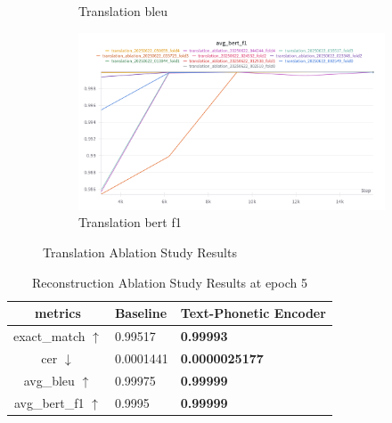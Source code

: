 \documentclass[letterpaper]{article} %
\begin{document}
\begin{figure}[ht]
\begin{subfigure}[b]{0.45\textwidth}
        \caption{Translation bleu}
        \label{fig:trans_bleu}
    \end{subfigure}
    \begin{subfigure}[b]{0.45\textwidth}
        \centering
        \includegraphics[width=\textwidth]{figures/trans_bert_f1.png}
        \caption{Translation bert f1}
        \label{fig:trans_bert_f1}
    \end{subfigure}
    \caption{Translation Ablation Study Results}
    \label{fig:trans_results}
\end{figure}


\begin{table}[t]
    \begin{tabular}{cll}
        \textbf{metrics}         & \textbf{Baseline} & \textbf{Text-Phonetic Encoder} \\ \hline
        exact\_match $\uparrow$  & 0.99517           & \textbf{0.99993}         \\
        cer $\downarrow$         & 0.0001441         & \textbf{0.0000025177}    \\
        avg\_bleu $\uparrow$     & 0.99975           & \textbf{0.99999}         \\
        avg\_bert\_f1 $\uparrow$ & 0.9995            & \textbf{0.99999}
    \end{tabular}
    \caption{Reconstruction Ablation Study Results at epoch 5}
    \label{tab:recon_results}
\end{table}
\end{document}
